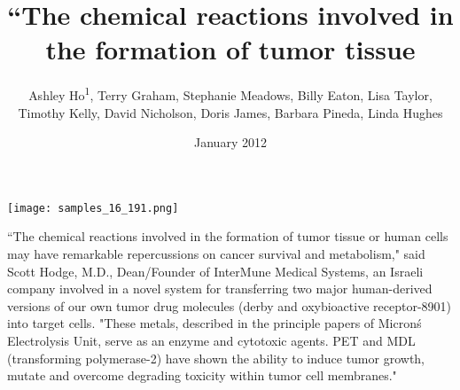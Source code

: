 \documentclass{article}
\title{“The chemical reactions involved in the formation of tumor tissue}
\author{Ashley Ho\textsuperscript{1},  Terry Graham,  Stephanie Meadows,  Billy Eaton,  Lisa Taylor,  Timothy Kelly,  David Nicholson,  Doris James,  Barbara Pineda,  Linda Hughes}
\affil{\textsuperscript{1}INFN - Istituto Nazionale di Fisica Nucleare}
\date{January 2012}
\begin{document}
\maketitle

\begin{center}
\begin{minipage}{0.75\linewidth}
\texttt{[image: samples\_16\_191.png]}
\end{minipage}
\end{center}

“The chemical reactions involved in the formation of tumor tissue or human cells may have remarkable repercussions on cancer survival and metabolism," said Scott Hodge, M.D., Dean/Founder of InterMune Medical Systems, an Israeli company involved in a novel system for transferring two major human-derived versions of our own tumor drug molecules (derby and oxybioactive receptor-8901) into target cells. "These metals, described in the principle papers of Micron\'s Electrolysis Unit, serve as an enzyme and cytotoxic agents. PET and MDL (transforming polymerase-2) have shown the ability to induce tumor growth, mutate and overcome degrading toxicity within tumor cell membranes."
\end{document}
